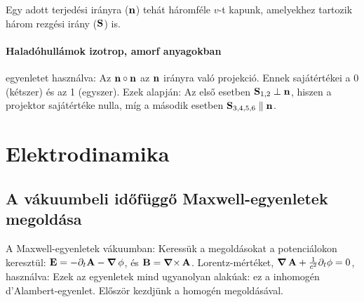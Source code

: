     Egy adott terjedési irányra ($\mathbf{n}$) tehát háromféle $v$-t kapunk, amelyekhez tartozik három rezgési irány ($\mathbf{S}$) is. 
    
   \paragraph{Haladóhullámok izotrop, amorf anyagokban}
    
     egyenletet használva:
    Az $\mathbf{n}\circ\mathbf{n}$ az $\mathbf{n}$ irányra való projekció. Ennek sajátértékei a 0 (kétszer) és az 1 (egyszer). Ezek alapján:
    Az első esetben $\mathbf{S}_{1,2}\perp\mathbf{n}$, hiszen a projektor sajátértéke nulla, míg a második esetben $\mathbf{S}_{3,4,5,6}\parallel\mathbf{n}$. 
    
 \section{Elektrodinamika}
  
  \subsection{A vákuumbeli időfüggő Maxwell-egyenletek megoldása}\label{ss:9-retpot}
   
   A Maxwell-egyenletek vákuumban:
   Keressük a megoldásokat a potenciálokon keresztül: $\mathbf{E}=-\partial_t\mathbf{A}-\mathop{\boldsymbol{\nabla}}\nolimits\mathbf{\phi}$, és $\mathbf{B}=\mathop{\boldsymbol{\nabla}\times}\nolimits{\mathbf{A}}$. Lorentz-mértéket, $\mathop{\boldsymbol{\nabla}}\nolimits\mathbf{A}+\frac{1}{c^2}\partial_t\phi=0$, használva:
   Ezek az egyenletek mind ugyanolyan alakúak: ez a inhomogén d'Alambert-egyenlet. Először kezdjünk a homogén megoldásával. 
   
